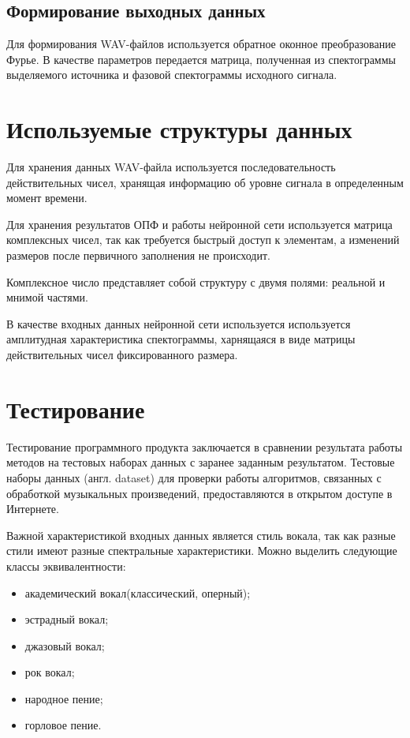 \subsection{Формирование выходных данных}

Для формирования WAV-файлов используется обратное оконное преобразование Фурье. В качестве параметров передается матрица, полученная из спектограммы выделяемого источника и фазовой спектограммы исходного сигнала.

\section{Используемые структуры данных}

Для хранения данных WAV-файла используется последовательность действительных чисел, хранящая информацию об уровне сигнала в определенным момент времени.

Для хранения результатов ОПФ и работы нейронной сети используется матрица комплексных чисел, так как требуется быстрый доступ к элементам, а изменений размеров после первичного заполнения не происходит. 

Комплексное число представляет собой структуру с двумя полями: реальной и мнимой частями.

В качестве входных данных нейронной сети используется используется амплитудная характеристика спектограммы, харнящаяся в виде матрицы действительных чисел фиксированного размера.

\section{Тестирование}

Тестирование программного продукта заключается в сравнении результата работы методов на тестовых наборах данных с заранее заданным результатом. Тестовые наборы данных (англ. dataset) для проверки работы алгоритмов, связанных с обработкой музыкальных произведений, предоставляются в открытом доступе в Интернете.

Важной характеристикой входных данных является стиль вокала, так как разные стили имеют разные спектральные характеристики. Можно выделить следующие классы эквивалентности:

\begin{itemize}
	\item академический вокал(классический, оперный);
	\item эстрадный вокал;
	\item джазовый вокал;
	\item рок вокал;
	\item народное пение;
	\item горловое пение.
\end{itemize}

